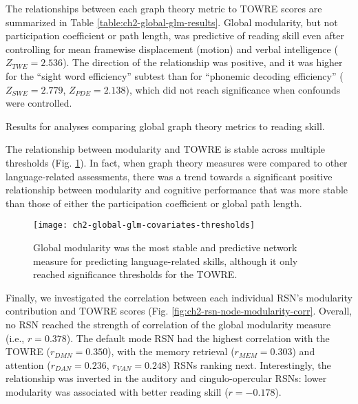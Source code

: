 The relationships between each graph theory metric to TOWRE scores are summarized in Table \ref{table:ch2-global-glm-results}. Global modularity, but not participation coefficient or path length, was predictive of reading skill even after controlling for mean framewise displacement (motion) and verbal intelligence ($Z_{TWE} = 2.536$). The direction of the relationship was positive, and it was higher for the ``sight word efficiency'' subtest than for ``phonemic decoding efficiency'' ($Z_{SWE} = 2.779$, $Z_{PDE} = 2.138$), which did not reach significance when confounds were controlled. 

\begin{table}[t]
    \renewcommand{\tabcolsep}{0.09cm}
    \centering
    
    \caption[Comparison of global graph theory metrics to reading skill.]{Results for analyses comparing global graph theory metrics to reading skill.}
    \label{table:ch2-global-glm-results}
\end{table}

The relationship between modularity and TOWRE is stable across multiple thresholds (Fig. \ref{fig:ch2-global-glm-covariates-thresh}). In fact, when graph theory measures were compared to other language-related assessments, there was a trend towards a significant positive relationship between modularity and cognitive performance that was more stable than those of either the participation coefficient or global path length. 

\begin{figure}[t]
    \centering
    \texttt{[image: ch2-global-glm-covariates-thresholds]}
    \caption[Modularity metrics at rest are the best predictors of cognitive skills.] {Global modularity was the most stable and predictive network measure for predicting language-related skills, although it only reached significance thresholds for the TOWRE.}
    \label{fig:ch2-global-glm-covariates-thresh}
\end{figure}

Finally, we investigated the correlation between each individual RSN's modularity contribution and TOWRE scores (Fig. \ref{fig:ch2-rsn-node-modularity-corr}. Overall, no RSN reached the strength of correlation of the global modularity measure (i.e., $r = 0.378$). The default mode RSN had the highest correlation with the TOWRE ($r_{DMN} = 0.350$), with the memory retrieval ($r_{MEM} = 0.303$) and attention ($r_{DAN} = 0.236$, $r_{VAN} = 0.248$) RSNs ranking next. Interestingly, the relationship was inverted in the auditory and cingulo-opercular RSNs: lower modularity was associated with better reading skill ($r = -0.178$).


